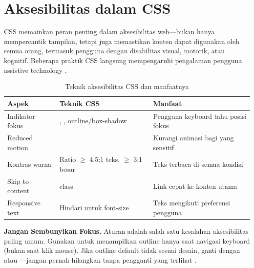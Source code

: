 \section{Aksesibilitas dalam CSS}

CSS memainkan peran penting dalam aksesibilitas web---bukan hanya mempercantik tampilan, tetapi juga memastikan konten dapat digunakan oleh semua orang, termasuk pengguna dengan disabilitas visual, motorik, atau kognitif. Beberapa praktik CSS langsung mempengaruhi pengalaman pengguna assistive technology \cite{mdnAccessibility}.

\begin{table}[htbp]
\centering
\small
\begin{tabular}{|P{3.2cm}|P{2.4cm}|P{3cm}|}
\hline
\textbf{Aspek} & \textbf{Teknik CSS} & \textbf{Manfaat} \\
\hline
Indikator fokus & , , outline/box-shadow & Pengguna keyboard tahu posisi fokus \\
\hline
Reduced motion & \parbox[t]{2.4cm}{\raggedright{}\linebreak[0]} & Kurangi animasi bagi yang sensitif \\
\hline
Kontras warna & Ratio $\geq$ 4.5:1 teks, $\geq$ 3:1 besar & Teks terbaca di semua kondisi \\
\hline
Skip to content &  class & Link cepat ke konten utama \\
\hline
Responsive text & Hindari  untuk font-size & Teks mengikuti preferensi pengguna \\
\hline
\end{tabular}
\caption{Teknik aksesibilitas CSS dan manfaatnya}
\end{table}


\begin{konsep}
\textbf{Jangan Sembunyikan Fokus.} Aturan  adalah salah satu kesalahan aksesibilitas paling umum. Gunakan  untuk menampilkan outline hanya saat navigasi keyboard (bukan saat klik mouse). Jika outline default tidak sesuai desain, ganti dengan  atau ---jangan pernah hilangkan tanpa pengganti yang terlihat \cite{webdevAccessibility}.
\end{konsep}

